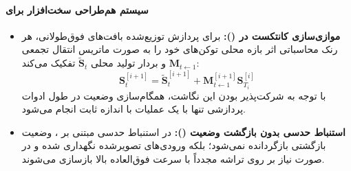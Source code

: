\paragraph*{سیستم هم‌طراحی سخت‌افزار برای }
\begin{itemize}
    \item \textbf{موازی‌سازی کانتکست در  ():} برای پردازش توزیع‌شده بافت‌های فوق‌طولانی، هر رنک محاسباتی اثر بازه محلی توکن‌های خود را به صورت ماتریس انتقال تجمعی $\mathbf{M}_{t \leftarrow 1}$ و بردار تولید محلی $\tilde{\mathbf{S}}_t$ تفکیک می‌کند:
    \begin{equation}
        \mathbf{S}_t^{[i+1]} = \tilde{\mathbf{S}}_t^{[i+1]} + \mathbf{M}_{t \leftarrow 1}^{[i+1]} \mathbf{S}_{T_i}^{[i]}
    \end{equation}
    با توجه به شرکت‌پذیر بودن این نگاشت، همگام‌سازی وضعیت در طول ادوات پردازشی تنها با یک عملیات  با اندازه ثابت انجام می‌شود.
    \item \textbf{استنباط حدسی بدون بازگشت وضعیت ():} در استنباط حدسی مبتنی بر ، وضعیت بازگشتی  بازگردانده نمی‌شود؛ بلکه ورودی‌های تصویرشده نگهداری شده و در صورت نیاز بر روی تراشه مجدداً با سرعت فوق‌العاده بالا بازسازی می‌شوند.
\end{itemize}